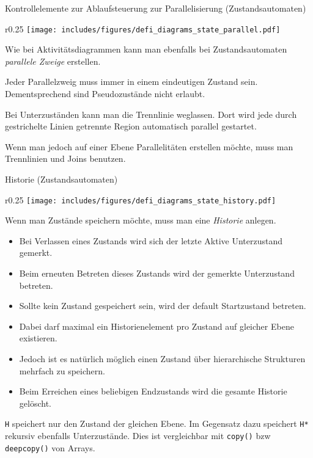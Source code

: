 \begin{diag}{Kontrollelemente zur Ablaufsteuerung zur Parallelisierung (Zustandsautomaten)}
    \begin{wrapfigure}{r}{0.25\textwidth}
        \centering
        \texttt{[image: includes/figures/defi\_diagrams\_state\_parallel.pdf]}
    \end{wrapfigure}
    Wie bei Aktivitätsdiagrammen kann man ebenfalls bei Zustandsautomaten \emph{parallele Zweige} erstellen.

    Jeder Parallelzweig muss immer in einem eindeutigen Zustand sein.
    Dementsprechend sind Pseudozustände nicht erlaubt.

    Bei Unterzuständen kann man die Trennlinie weglassen.
    Dort wird jede durch gestrichelte Linien getrennte Region automatisch parallel gestartet.

    Wenn man jedoch auf einer Ebene Parallelitäten erstellen möchte, muss man Trennlinien und Joins benutzen.
\end{diag}

\begin{diag}{Historie (Zustandsautomaten)}
    \begin{wrapfigure}{r}{0.25\textwidth}
        \centering
        \texttt{[image: includes/figures/defi\_diagrams\_state\_history.pdf]}
    \end{wrapfigure}
    Wenn man Zustände speichern möchte, muss man eine \emph{Historie} anlegen.

    \begin{itemize}
        \item Bei Verlassen eines Zustands wird sich der letzte Aktive Unterzustand gemerkt.
        \item Beim erneuten Betreten dieses Zustands wird der gemerkte Unterzustand betreten.
        \item Sollte kein Zustand gespeichert sein, wird der default Startzustand betreten.
        \item Dabei darf maximal ein Historienelement pro Zustand auf gleicher Ebene existieren.
        \item Jedoch ist es natürlich möglich einen Zustand über hierarchische Strukturen mehrfach zu speichern.
        \item Beim Erreichen eines beliebigen Endzustands wird die gesamte Historie gelöscht.
    \end{itemize}

    \texttt{H} speichert nur den Zustand der gleichen Ebene.
    Im Gegensatz dazu speichert \texttt{H*} rekursiv ebenfalls Unterzustände. Dies ist vergleichbar mit \texttt{copy()} bzw \texttt{deepcopy()} von Arrays.
\end{diag}

